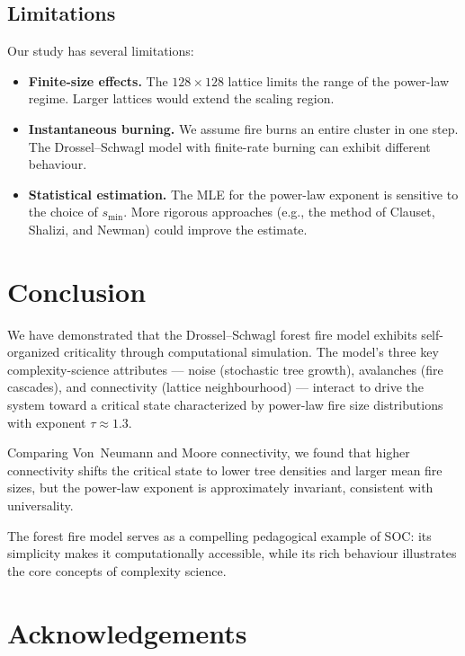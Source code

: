 \documentclass[12pt, a4paper, twocolumn]{article}
\begin{document}
\subsection{Limitations}

Our study has several limitations:
\begin{itemize}[leftmargin=*]
    \item \textbf{Finite-size effects.} The $128 \times 128$ lattice limits the range of the power-law regime. Larger lattices would extend the scaling region.
    \item \textbf{Instantaneous burning.} We assume fire burns an entire cluster in one step. The Drossel--Schwagl model with finite-rate burning can exhibit different behaviour.
    \item \textbf{Statistical estimation.} The MLE for the power-law exponent is sensitive to the choice of $s_{\min}$. More rigorous approaches (e.g., the method of Clauset, Shalizi, and Newman) could improve the estimate.
\end{itemize}

\section{Conclusion}
\label{sec:conclusion}

We have demonstrated that the Drossel--Schwagl forest fire model exhibits self-organized criticality through computational simulation.
The model's three key complexity-science attributes --- noise (stochastic tree growth), avalanches (fire cascades), and connectivity (lattice neighbourhood) --- interact to drive the system toward a critical state characterized by power-law fire size distributions with exponent $\tau \approx 1.3$.

Comparing Von~Neumann and Moore connectivity, we found that higher connectivity shifts the critical state to lower tree densities and larger mean fire sizes, but the power-law exponent is approximately invariant, consistent with universality.

The forest fire model serves as a compelling pedagogical example of SOC: its simplicity makes it computationally accessible, while its rich behaviour illustrates the core concepts of complexity science.

\section*{Acknowledgements}
\end{document}
